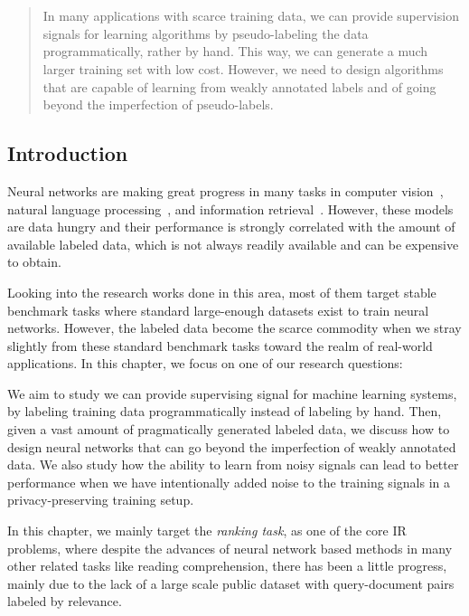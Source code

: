 \chapter{}
\label{chap:4}
%
\begin{quote}
In many applications with scarce training data, we can provide supervision signals for learning algorithms by pseudo-labeling the data programmatically, rather by hand. This way, we can generate a much larger training set with low cost. However, we need to design algorithms that are capable of learning from weakly annotated labels and of going beyond the imperfection of pseudo-labels. 
\end{quote}
%
\section{Introduction}
Neural networks are making great progress in many tasks in computer vision~\citep{krizhevsky2012imagenet}, natural language processing~\citep{collobert2008unified}, and information retrieval~\citep{welling2005exponential}. However, these models are data hungry and their performance is strongly correlated with the amount of available labeled data, which is not always readily available and can be expensive to obtain. 

Looking into the research works done in this area, most of them target stable benchmark tasks where standard large-enough datasets exist to train neural networks. However, the labeled data become the scarce commodity when we stray slightly from these standard benchmark tasks toward the realm of real-world applications. In this chapter, we focus on one of our research questions:

We aim to study we can provide supervising signal for machine learning systems, by labeling training data programmatically instead of labeling by hand. Then, given a vast amount of pragmatically generated labeled data, we discuss how to design neural networks that can go beyond the imperfection of weakly annotated data. We also study how the ability to learn from noisy signals can lead to better performance when we have intentionally added noise to the training signals in a privacy-preserving training setup.

\medskip
In this chapter, we mainly target the \emph{ranking task}, as one of the core IR problems, where despite the advances of neural network based methods in many other related tasks like reading comprehension, there has been a little progress, mainly due to the lack of a large scale public dataset with query-document pairs labeled by relevance. 

